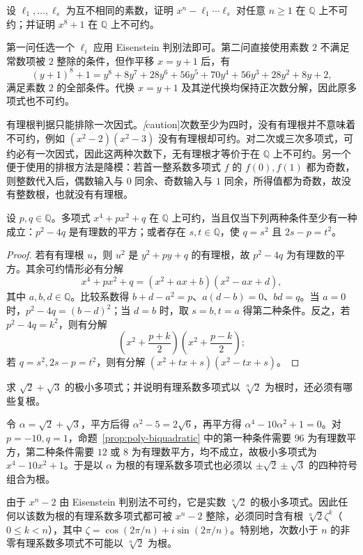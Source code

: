 \begin{example}
\label{ex:poly-eisenstein-examples}
设 $\ell_1,\ldots,\ell_s$ 为互不相同的素数，证明 $x^n-\ell_1\cdots\ell_s$ 对任意 $n\geq1$ 在 $\mathbb Q$ 上不可约；并证明 $x^8+1$ 在 $\mathbb Q$ 上不可约。
\end{example}
\begin{solve}
第一问任选一个 $\ell_i$ 应用 Eisenstein 判别法即可。第二问直接使用素数 $2$ 不满足常数项被 $2$ 整除的条件，但作平移 $x=y+1$ 后，有
\[
    (y+1)^8+1=y^8+8y^7+28y^6+56y^5+70y^4+56y^3+28y^2+8y+2,
\]
满足素数 $2$ 的全部条件。代换 $x=y+1$ 及其逆代换均保持正次数分解，因此原多项式也不可约。
\end{solve}

有理根判据只能排除一次因式。\emph[caution]{次数至少为四时，没有有理根并不意味着不可约}，例如 $(x^2-2)(x^2-3)$ 没有有理根却可约。对二次或三次多项式，可约必有一次因式，因此这两种次数下，无有理根才等价于在 $\mathbb Q$ 上不可约。另一个便于使用的排根方法是降模：若首一整系数多项式 $f$ 的 $f(0),f(1)$ 都为奇数，则整数代入后，偶数输入与 $0$ 同余、奇数输入与 $1$ 同余，所得值都为奇数，故没有整数根，也就没有有理根。

\begin{proposition}[双二次多项式的可约性]
\label{prop:poly-biquadratic}
设 $p,q\in\mathbb Q$。多项式 $x^4+px^2+q$ 在 $\mathbb Q$ 上可约，当且仅当下列两种条件至少有一种成立：$p^2-4q$ 是有理数的平方；或者存在 $s,t\in\mathbb Q$，使 $q=s^2$ 且 $2s-p=t^2$。
\end{proposition}
\begin{proof}
若有有理根 $u$，则 $u^2$ 是 $y^2+py+q$ 的有理根，故 $p^2-4q$ 为有理数的平方。其余可约情形必有分解
\[
    x^4+px^2+q=(x^2+ax+b)(x^2-ax+d),
\]
其中 $a,b,d\in\mathbb Q$。比较系数得 $b+d-a^2=p$、$a(d-b)=0$、$bd=q$。当 $a=0$ 时，$p^2-4q=(b-d)^2$；当 $d=b$ 时，取 $s=b,t=a$ 得第二种条件。反之，若 $p^2-4q=k^2$，则有分解
\[
    \left(x^2+\frac{p+k}{2}\right)\left(x^2+\frac{p-k}{2}\right);
\]
若 $q=s^2,2s-p=t^2$，则有分解 $(x^2+tx+s)(x^2-tx+s)$。
\end{proof}

\begin{example}
\label{ex:poly-conjugate-radicals}
求 $\sqrt2+\sqrt3$ 的极小多项式；并说明有理系数多项式以 $\sqrt[n]{2}$ 为根时，还必须有哪些复根。
\end{example}
\begin{solve}
令 $\alpha=\sqrt2+\sqrt3$，平方后得 $\alpha^2-5=2\sqrt6$，再平方得 $\alpha^4-10\alpha^2+1=0$。对 $p=-10,q=1$，命题~\ref{prop:poly-biquadratic} 中的第一种条件需要 $96$ 为有理数平方，第二种条件需要 $12$ 或 $8$ 为有理数平方，均不成立，故极小多项式为 $x^4-10x^2+1$。于是以 $\alpha$ 为根的有理系数多项式也必须以 $\pm\sqrt2\pm\sqrt3$ 的四种符号组合为根。

由于 $x^n-2$ 由 Eisenstein 判别法不可约，它是实数 $\sqrt[n]{2}$ 的极小多项式。因此任何以该数为根的有理系数多项式都可被 $x^n-2$ 整除，必须同时含有根 $\sqrt[n]{2}\zeta^k$（$0\leq k<n$），其中 $\zeta=\cos(2\pi/n)+i\sin(2\pi/n)$。特别地，次数小于 $n$ 的非零有理系数多项式不可能以 $\sqrt[n]{2}$ 为根。
\end{solve}

